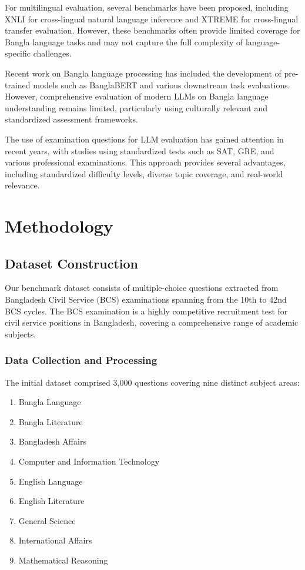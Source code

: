\documentclass[11pt,a4paper]{article}
\begin{document}
For multilingual evaluation, several benchmarks have been proposed, including XNLI \cite{conneau2018xnli} for cross-lingual natural language inference and XTREME \cite{hu2020xtreme} for cross-lingual transfer evaluation. However, these benchmarks often provide limited coverage for Bangla language tasks and may not capture the full complexity of language-specific challenges.

Recent work on Bangla language processing has included the development of pre-trained models such as BanglaBERT \cite{sarker2020banglabert} and various downstream task evaluations. However, comprehensive evaluation of modern LLMs on Bangla language understanding remains limited, particularly using culturally relevant and standardized assessment frameworks.

The use of examination questions for LLM evaluation has gained attention in recent years, with studies using standardized tests such as SAT, GRE, and various professional examinations. This approach provides several advantages, including standardized difficulty levels, diverse topic coverage, and real-world relevance.

\section{Methodology}

\subsection{Dataset Construction}

Our benchmark dataset consists of multiple-choice questions extracted from Bangladesh Civil Service (BCS) examinations spanning from the 10th to 42nd BCS cycles. The BCS examination is a highly competitive recruitment test for civil service positions in Bangladesh, covering a comprehensive range of academic subjects.

\subsubsection{Data Collection and Processing}

The initial dataset comprised 3,000 questions covering nine distinct subject areas:

\begin{enumerate}
    \item Bangla Language
    \item Bangla Literature
    \item Bangladesh Affairs
    \item Computer and Information Technology
    \item English Language
    \item English Literature
    \item General Science
    \item International Affairs
    \item Mathematical Reasoning
\end{enumerate}
\end{document}
